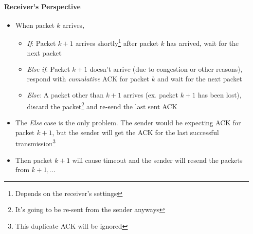 \paragraph{Receiver's Perspective}
\begin{itemize}
	\item When packet $k$ arrives,
	\begin{itemize}
		\item \textit{If}: Packet $k+1$ arrives shortly\footnote{Depends on the receiver's settings} after packet $k$ has arrived, wait for the next packet
		\item \textit{Else if}: Packet $k+1$ doesn't arrive (due to congestion or other reasons), respond with \textit{cumulative} ACK for packet $k$ and wait for the next packet
		\item \textit{Else}: A packet other than $k+1$ arrives (ex. packet $k+1$ has been lost), discard the packet\footnote{It's going to be re-sent from the sender anyways} and re-send the last sent ACK
	\end{itemize}
	\item The \textit{Else} case is the only problem. The sender would be expecting ACK for packet $k+1$, but the sender will get the ACK for the last successful transmission\footnote{This duplicate ACK will be ignored}
	\item Then packet $k+1$ will cause timeout and the sender will resend the packets from $k+1, \dots$
\end{itemize}


